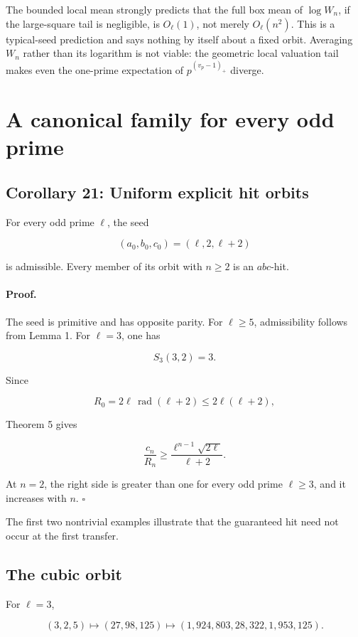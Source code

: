 \documentclass[11pt]{article}
\begin{document}
The bounded local mean strongly predicts that the full box mean of
\(\log W_n\), if the large-square tail is negligible, is
\(O_\ell(1)\), not merely \(O_\ell(n^2)\). This is a typical-seed
prediction and says nothing by itself about a fixed orbit. Averaging
\(W_n\) rather than its logarithm is not viable: the geometric local
valuation tail makes even the one-prime expectation of
\(p^{(v_p-1)_+}\) diverge.

\section{A canonical family for every odd prime}

\subsection{Corollary 21: Uniform explicit hit orbits}

For every odd prime \(\ell\), the seed

\[
(a_0,b_0,c_0)
=
(\ell,2,\ell+2)
\]

is admissible. Every member of its orbit with \(n\geq2\) is an
\(abc\)-hit.

\paragraph{Proof.}

The seed is primitive and has opposite parity. For \(\ell\geq5\),
admissibility follows from Lemma 1. For \(\ell=3\), one has

\[
S_3(3,2)=3.
\]

Since

\[
R_0
=
2\ell\,\operatorname{rad}(\ell+2)
\leq
2\ell(\ell+2),
\]

Theorem 5 gives

\[
\frac{c_n}{R_n}
\geq
\frac{\ell^{n-1}\sqrt{2\ell}}
{\ell+2}.
\]

At \(n=2\), the right side is greater than one for every odd prime
\(\ell\geq3\), and it increases with \(n\). \(\square\)

The first two nontrivial examples illustrate that the guaranteed hit need
not occur at the first transfer.

\subsection{The cubic orbit}

For \(\ell=3\),

\[
(3,2,5)
\longmapsto
(27,98,125)
\longmapsto
(1{,}924{,}803,28{,}322,1{,}953{,}125).
\]
\end{document}
